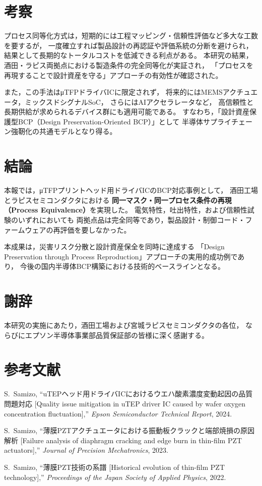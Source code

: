\documentclass[conference]{IEEEtran}
\begin{document}
\section{考察}
プロセス同等化方式は，短期的には工程マッピング・信頼性評価など多大な工数を要するが，
一度確立すれば製品設計の再認証や評価系統の分断を避けられ，
結果として長期的なトータルコストを低減できる利点がある。
本研究の結果，酒田・ラピス両拠点における製造条件の完全同等化が実証され，
「プロセスを再現することで設計資産を守る」アプローチの有効性が確認された。

また，この手法はμTFPドライバICに限定されず，
将来的にはMEMSアクチュエータ，ミックスドシグナルSoC，
さらにはAIアクセラレータなど，
高信頼性と長期供給が求められるデバイス群にも適用可能である。
すなわち，「設計資産保護型BCP（Design Preservation-Oriented BCP）」として
半導体サプライチェーン強靭化の共通モデルとなり得る。

\section{結論}
本報では，μTFPプリントヘッド用ドライバICのBCP対応事例として，
酒田工場とラピスセミコンダクタにおける
\textbf{同一マスク・同一プロセス条件の再現（Process Equivalence）}を実現した。
電気特性，吐出特性，および信頼性試験のいずれにおいても
両拠点品は完全同等であり，製品設計・制御コード・ファームウェアの再評価を要しなかった。

本成果は，災害リスク分散と設計資産保全を同時に達成する
「Design Preservation through Process Reproduction」アプローチの実用的成功例であり，
今後の国内半導体BCP構築における技術的ベースラインとなる。

\section*{謝辞}
本研究の実施にあたり，酒田工場および宮城ラピスセミコンダクタの各位，
ならびにエプソン半導体事業部品質保証部の皆様に深く感謝する。

\section*{参考文献}
\begin{thebibliography}{99}

S.~Samizo, 
``uTEPヘッド用ドライバICにおけるウエハ酸素濃度変動起因の品質問題対応
[Quality issue mitigation in uTEP driver IC caused by wafer oxygen concentration fluctuation],'' 
\textit{Epson Semiconductor Technical Report}, 2024.

S.~Samizo, 
``薄膜PZTアクチュエータにおける振動板クラックと端部焼損の原因解析
[Failure analysis of diaphragm cracking and edge burn in thin-film PZT actuators],'' 
\textit{Journal of Precision Mechatronics}, 2023.

S.~Samizo, 
``薄膜PZT技術の系譜
[Historical evolution of thin-film PZT technology],'' 
\textit{Proceedings of the Japan Society of Applied Physics}, 2022.

\end{thebibliography}
\end{document}
